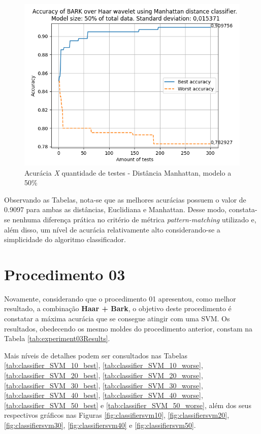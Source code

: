 		\newpage
		\begin{figure}
			\centering
			\includegraphics{images/results/confusionMatrices/classifier_Manhattan_50.png}
			\caption{Acurácia \textit{X} quantidade de testes - Distância Manhattan, modelo a 50\%}
			\label{fig:classifiermanhattan50}
		\end{figure}
		
		
		\par Observando as Tabelas, nota-se que as melhores acurácias possuem o valor de 0.9097 para ambas as distâncias, Euclidiana e Manhattan.  Desse modo, constata-se nenhuma diferença prática no critério de métrica \textit{pattern-matching} utilizado e, além disso, um nível de acurácia relativamente alto considerando-se a simplicidade do algoritmo classificador.
	
		\section{Procedimento 03}
		\label{chap:testsResults:sec:Experimento03}
			\par Novamente, considerando que o procedimento 01 apresentou, como melhor resultado, a combinação \textbf{Haar + Bark}, o objetivo deste procedimento é constatar a máxima acurácia que se consegue atingir com uma SVM. Os resultados, obedecendo os mesmo moldes do procedimento anterior, constam na Tabela \ref{tab:experiment03Results}. 
			
			\par Mais níveis de detalhes podem ser consultados nas Tabelas \ref{tab:classifier_SVM_10_best}, \ref{tab:classifier_SVM_10_worse}, \ref{tab:classifier_SVM_20_best}, \ref{tab:classifier_SVM_20_worse}, \ref{tab:classifier_SVM_30_best}, \ref{tab:classifier_SVM_30_worse}, \ref{tab:classifier_SVM_40_best}, \ref{tab:classifier_SVM_40_worse}, \ref{tab:classifier_SVM_50_best} e \ref{tab:classifier_SVM_50_worse}, além dos seus respectivos gráficos nas Figuras \ref{fig:classifiersvm10}, \ref{fig:classifiersvm20}, \ref{fig:classifiersvm30}, \ref{fig:classifiersvm40} e \ref{fig:classifiersvm50}.
	
